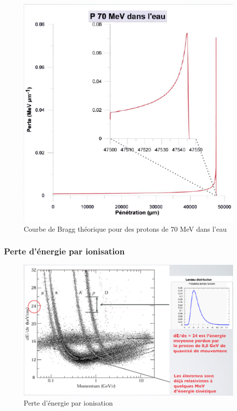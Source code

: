     \begin{figure}[ht]
        \centering
        \includegraphics[scale=0.60]{Images1/picbragg.PNG}
        \caption{Courbe de Bragg théorique pour des protons de 70 MeV dans l'eau}
    \end{figure}
    
    \subsubsection{Perte d'énergie par ionisation}
    
    \begin{figure}[ht]
        \centering
        \includegraphics[scale=0.60]{Images1/perteionisation.PNG}
        \caption{Perte d'énergie par ionisation}
    \end{figure}
    
